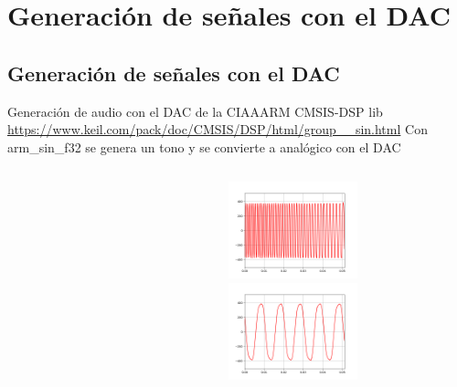  \section{Generación de señales con el DAC}
 \subsection{Generación de señales con el DAC}
 \begin{frame}[t]{Generación de audio con el DAC de la CIAA}{ARM CMSIS-DSP lib \tiny
    \href{https://www.keil.com/pack/doc/CMSIS/DSP/html/group\_\_sin.HTML}{https://www.keil.com/pack/doc/CMSIS/DSP/html/group\_\_sin.html}
    }
    \protoboardicon
    Con arm\_sin\_f32 se genera un tono y se convierte a analógico con el DAC
    \normalsize
       \begin{columns}[t]
          \hspace{2pt}
          \begin{column}[c]{.2\textwidth}
             
          \end{column}
          \hspace{2pt}
          \vrule
          \hspace{2pt}
          \begin{column}[c]{.4\textwidth}
             
          \end{column}
          \hspace{2pt}
          \vrule
          \hspace{2pt}
          \begin{column}[c]{.4\textwidth}
             \begin{center}
                \includegraphics[width=6cm,height=2.8cm]{2_clase/ciaa_audio_gen1.png} \\
                \includegraphics[width=6cm,height=2.8cm]{2_clase/ciaa_audio_gen2.png}
             \end{center}
          \end{column}
          \hspace{2pt}
       \end{columns}
   \vfill
 \end{frame}
